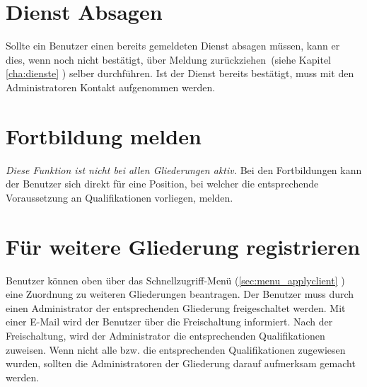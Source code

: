 \section{Dienst Absagen}
\label{sec:process_service_cancel}
Sollte ein Benutzer einen bereits gemeldeten Dienst absagen müssen, kann er dies, wenn noch nicht bestätigt, über \glqq Meldung zurückziehen\grqq ~(siehe Kapitel \ref{cha:dienste} ) selber durchführen. Ist der Dienst bereits bestätigt, muss mit den Administratoren Kontakt aufgenommen werden.

\section{Fortbildung melden}
\label{sec:process_training_apply}
\textit{{\small Diese Funktion ist nicht bei allen Gliederungen aktiv.}}
Bei den Fortbildungen kann der Benutzer sich direkt für eine Position, bei welcher die entsprechende Voraussetzung an Qualifikationen vorliegen, melden.

\section{Für weitere Gliederung registrieren}
\label{sec:process_apply_client}
Benutzer können oben über das Schnellzugriff-Menü (\ref{sec:menu_applyclient} ) eine Zuordnung zu weiteren Gliederungen beantragen. Der Benutzer muss durch einen Administrator der entsprechenden Gliederung freigeschaltet werden. Mit einer E-Mail wird der Benutzer über die Freischaltung informiert. Nach der Freischaltung, wird der Administrator die entsprechenden Qualifikationen zuweisen. Wenn nicht alle bzw. die entsprechenden Qualifikationen zugewiesen wurden, sollten die Administratoren der Gliederung darauf aufmerksam gemacht werden.